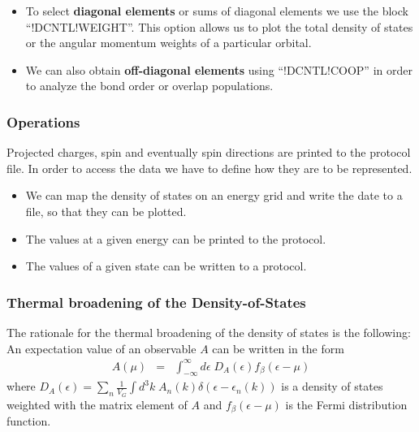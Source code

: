 \documentclass[final,12pt,makeidx,DIV=calc]{article}
\begin{document}
{{{{{{\begin{itemize}

\item To select {\bf diagonal elements} or sums of diagonal elements we use
  the block ``!DCNTL!WEIGHT''. This option allows us to plot the
  total density of states or the angular momentum weights of a
  particular orbital.

\item We can also obtain {\bf off-diagonal elements} using
  ``!DCNTL!COOP'' in order to analyze the bond order or overlap
  populations.

\end{itemize}

\subsubsection{Operations}
Projected charges, spin and eventually spin directions are printed to
the protocol file.  In order to access the data we have to define how
they are to be represented.
\begin{itemize}
\item We can map the density of states on an energy grid and write the
date to a file, so that they can be plotted.
\item The values at a given energy can be printed to the protocol.
\item The values of a given state can be written to a protocol.
\end{itemize}

\subsubsection{Thermal broadening of the Density-of-States}
\label{sec:thermalbroadening}
The rationale for the thermal broadening of the density of states is
the following: An expectation value of an observable $A$ can be
written in the form
\begin{eqnarray}
A(\mu)&=&\int_{-\infty}^\infty d\epsilon\; D_A(\epsilon) f_\beta(\epsilon-\mu)
\label{eq:aofmu}
\end{eqnarray}
where $D_A(\epsilon)=\sum_n\frac{1}{V_G}\int d^3k\;
A_n(k)\delta(\epsilon-\epsilon_n(k))$ is a density of states
weighted with the matrix element of $A$ and $f_{\beta}(\epsilon-\mu)$
is the Fermi distribution function.

}}}}}}
\end{document}
